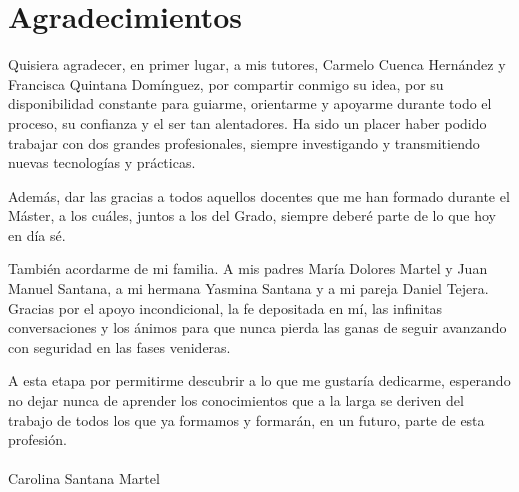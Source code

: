 \chapter*{Agradecimientos}

Quisiera agradecer, en primer lugar, a mis tutores, Carmelo Cuenca Hernández y Francisca Quintana Domínguez, por compartir conmigo su idea, por su disponibilidad constante para guiarme, orientarme y apoyarme durante todo el proceso, su confianza y el ser tan alentadores. Ha sido un placer haber podido trabajar con dos grandes profesionales, siempre investigando y transmitiendo nuevas tecnologías y prácticas.  

Además, dar las gracias a todos aquellos docentes que me han formado durante el Máster, a los cuáles, juntos a los del Grado, siempre deberé parte de lo que hoy en día sé.

También acordarme de mi familia. A mis padres María Dolores Martel y Juan Manuel Santana, a mi hermana Yasmina Santana y a mi pareja Daniel Tejera. Gracias por el apoyo incondicional, la fe depositada en mí, las infinitas conversaciones y los ánimos para que nunca pierda las ganas de seguir avanzando con seguridad en las fases venideras.

A esta etapa por permitirme descubrir a lo que me gustaría dedicarme, esperando no dejar nunca de aprender los conocimientos que a la larga se deriven del trabajo de todos los que ya formamos y formarán, en un futuro, parte de esta profesión.
\\
\\
Carolina Santana Martel
